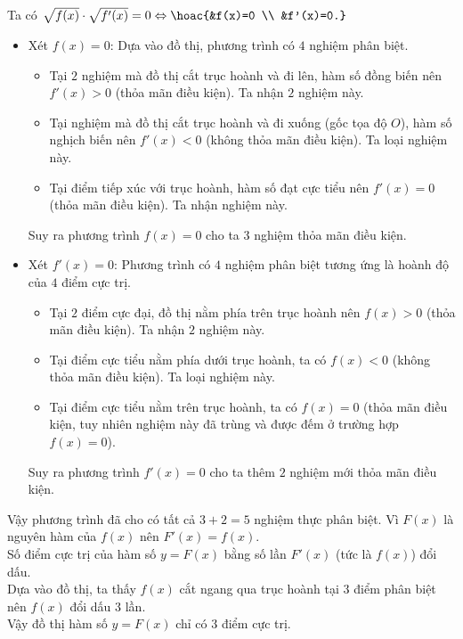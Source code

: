 \begin{ex}
{\begin{itemchoice}
			Ta có $\sqrt{f(x)}\cdot\sqrt{f'(x)}=0 \Leftrightarrow \hoac{&f(x)=0 \\ &f'(x)=0.}$
			\begin{itemize}
				\item Xét $f(x)=0$: Dựa vào đồ thị, phương trình có $4$ nghiệm phân biệt.
				\begin{itemize}
					\item Tại $2$ nghiệm mà đồ thị cắt trục hoành và đi lên, hàm số đồng biến nên $f'(x) > 0$ (thỏa mãn điều kiện). Ta nhận $2$ nghiệm này.
					\item Tại nghiệm mà đồ thị cắt trục hoành và đi xuống (gốc tọa độ $O$), hàm số nghịch biến nên $f'(x) < 0$ (không thỏa mãn điều kiện). Ta loại nghiệm này.
					\item Tại điểm tiếp xúc với trục hoành, hàm số đạt cực tiểu nên $f'(x) = 0$ (thỏa mãn điều kiện). Ta nhận nghiệm này.
				\end{itemize}
				Suy ra phương trình $f(x)=0$ cho ta $3$ nghiệm thỏa mãn điều kiện.
				\item Xét $f'(x)=0$: Phương trình có $4$ nghiệm phân biệt tương ứng là hoành độ của $4$ điểm cực trị.
				\begin{itemize}
					\item Tại $2$ điểm cực đại, đồ thị nằm phía trên trục hoành nên $f(x) > 0$ (thỏa mãn điều kiện). Ta nhận $2$ nghiệm này.
					\item Tại điểm cực tiểu nằm phía dưới trục hoành, ta có $f(x) < 0$ (không thỏa mãn điều kiện). Ta loại nghiệm này.
					\item Tại điểm cực tiểu nằm trên trục hoành, ta có $f(x) = 0$ (thỏa mãn điều kiện, tuy nhiên nghiệm này đã trùng và được đếm ở trường hợp $f(x)=0$).
				\end{itemize}
				Suy ra phương trình $f'(x)=0$ cho ta thêm $2$ nghiệm mới thỏa mãn điều kiện.
			\end{itemize}
			Vậy phương trình đã cho có tất cả $3+2=5$ nghiệm thực phân biệt.
			\itemch 
			Vì $F(x)$ là nguyên hàm của $f(x)$ nên $F'(x) = f(x)$.\\
			Số điểm cực trị của hàm số $y=F(x)$ bằng số lần $F'(x)$ (tức là $f(x)$) đổi dấu.\\
			Dựa vào đồ thị, ta thấy $f(x)$ cắt ngang qua trục hoành tại $3$ điểm phân biệt nên $f(x)$ đổi dấu $3$ lần.\\
			Vậy đồ thị hàm số $y=F(x)$ chỉ có $3$ điểm cực trị.
		\end{itemchoice}
	}
\end{ex}

